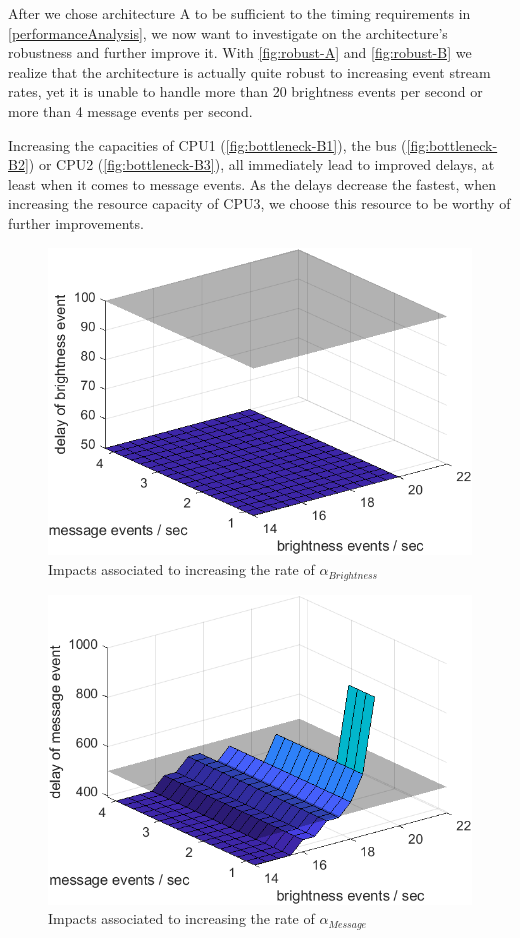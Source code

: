 
After we chose architecture A to be sufficient to the timing requirements in \autoref{performanceAnalysis}, we now want to investigate on the
architecture's robustness and further improve it.
With \autoref{fig:robust-A} and \autoref{fig:robust-B} we realize that the architecture is actually quite robust to increasing event stream rates,
yet it is unable to handle more than 20 brightness events per second or more than 4 message events per second.

Increasing the capacities of CPU1 (\autoref{fig:bottleneck-B1}), the bus (\autoref{fig:bottleneck-B2}) or CPU2 (\autoref{fig:bottleneck-B3}),
all immediately lead to improved delays, at least when it comes to message events.
As the delays decrease the fastest, when increasing the resource capacity of CPU3, we choose this resource to be worthy of further improvements.

\begin{figure}
    \centering
    \includegraphics[width=0.8\columnwidth]{graphics/robustA.png}
    \caption{Impacts associated to increasing the rate of \(\alpha_{Brightness}\)}\label{fig:robust-A}
\end{figure}

\begin{figure}
    \centering
    \includegraphics[width=0.8\columnwidth]{graphics/robustB.png}
    \caption{Impacts associated to increasing the rate of \(\alpha_{Message}\)}\label{fig:robust-B}
\end{figure}

